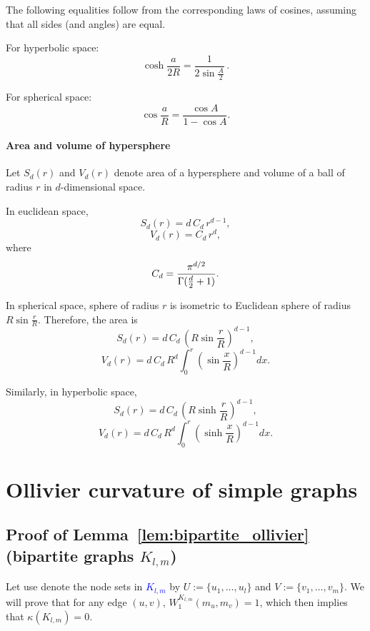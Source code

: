 \documentclass{article} %
\newcommand{\ph}[1]{\textcolor{blue}{#1}}
\begin{document}
The following equalities follow from the corresponding laws of cosines, assuming that all sides (and angles) are equal.

For hyperbolic space:
\begin{equation}\label{eq:hyp_eq}
\cosh\frac{a}{2R} = \frac{1}{2\sin \frac{A}{2}}\,.
\end{equation}

For spherical space:
\begin{equation}\label{eq:sph_eq}
\cos{\frac{a}{R}} = \frac{\cos A}{1 - \cos A}.
\end{equation}

\paragraph{Area and volume of hypersphere}

Let $S_d(r)$ and $V_d(r)$ denote area of a hypersphere and volume of a ball of radius $r$ in $d$-dimensional space. 

In euclidean space,
\[
S_d(r)= d \, C_{d} \, r^{d-1},
\]
\[
V_d(r)= C_{d} \, r^{d},
\]
where
\[
C_{d}={\frac  {\pi ^{{d/2}}}{\Gamma ({d \over 2}+1)}}.
\]

In spherical space, sphere of radius $r$ is isometric to Euclidean sphere of radius $R \sin \frac{r}{R}$. Therefore, the area is 
\[
S_d(r)= d \, C_{d} \, \left( R \sin \frac{r}{R} \right)^{d-1},
\]
\[
V_d(r)= d \, C_{d} \, R^d \int_{0}^{r} \left( \sin \frac{x}{R} \right)^{d-1} d x .
\]

Similarly, in hyperbolic space,
\[
S_d(r)= d \, C_{d} \, \left( R \sinh \frac{r}{R} \right)^{d-1},
\]
\[
V_d(r)= d \, C_{d} \, R^d \int_{0}^{r} \left( \sinh \frac{x}{R} \right)^{d-1} d x .
\]


\section{Ollivier curvature of simple graphs}

\subsection{Proof of Lemma~\ref{lem:bipartite_ollivier} (bipartite graphs $K_{l,m}$)}

Let use denote the node sets in \ph{$K_{l,m}$} by $U := \{u_1, \dots, u_l\}$ and $V := \{v_1, \dots, v_m\}$. We will prove that for any edge $(u, v)$, $W_1^{K_{l,m}}(m_{u},m_{v}) = 1$, which then implies that $\kappa(K_{l,m}) = 0$. 
\end{document}
